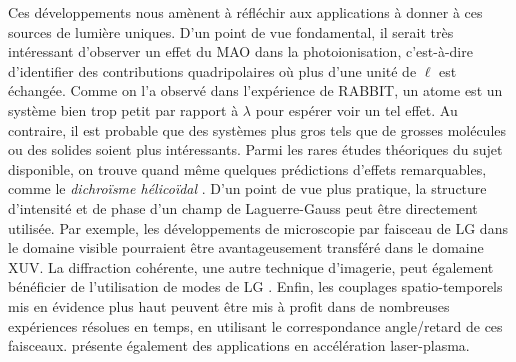 Ces développements nous amènent à réfléchir aux applications à donner à ces sources de lumière uniques. D'un point de vue fondamental, il serait très intéressant d'observer un effet du MAO dans la photoionisation, c'est-à-dire d'identifier des contributions quadripolaires où plus d'une unité de $\ell$ est échangée. Comme on l'a observé dans l'expérience de RABBIT, un atome est un système bien trop petit par rapport à $\lambda$ pour espérer voir un tel effet. Au contraire, il est probable que des systèmes plus gros tels que de grosses molécules ou des solides soient plus intéressants. Parmi les rares études théoriques du sujet disponible, on trouve quand même quelques prédictions d'effets remarquables, comme le \textit{dichroïsme hélicoïdal} .
D'un point de vue plus pratique, la structure d'intensité et de phase d'un champ de Laguerre-Gauss peut être directement utilisée. Par exemple, les développements de microscopie par faisceau de LG dans le domaine visible  pourraient être avantageusement transféré dans le domaine XUV. La diffraction cohérente, une autre technique d'imagerie, peut également bénéficier de l'utilisation de modes de LG . Enfin, les couplages spatio-temporels mis en évidence plus haut peuvent être mis à profit dans de nombreuses expériences résolues en temps, en utilisant le correspondance angle/retard de ces faisceaux.  présente également des applications en accélération laser-plasma.